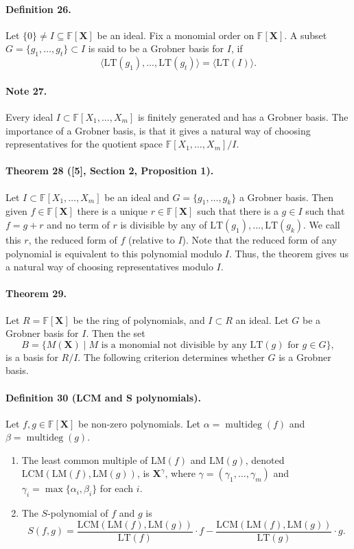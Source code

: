 \documentclass[10pt,a4paper]{article}
\begin{document}
\paragraph{Definition 26.} Let $\{0\}\neq I\subseteq\mathbb F[\boldsymbol X]$ be an ideal. Fix a monomial order on $\mathbb F[\boldsymbol X]$. A subset $G=\{g_1,\ldots,g_t\}\subset I$ is said to be a Grobner basis for $I$, if
\[\langle\mathrm{LT}(g_1),\ldots,\mathrm{LT}(g_t)\rangle=\langle\mathrm{LT}(I)\rangle.\]
\paragraph{Note 27.} Every ideal $I\subset\mathbb F[X_1,\ldots,X_m]$ is finitely generated and has a Grobner basis.
The importance of a Grobner basis, is that it gives a natural way of choosing representatives for the quotient space $\mathbb F[X_1,\ldots,X_m]/I$.
\paragraph{Theorem 28 ([5], Section 2, Proposition 1).} Let $I\subset\mathbb F[X_1,\ldots,X_m]$ be an ideal and $G=\{g_1,\ldots,g_k\}$ a Grobner basis. Then given $f\in\mathbb F[\boldsymbol X]$ there is a unique $r\in\mathbb F[\boldsymbol X]$ such that there is a $g\in I$ such that $f=g+r$ and no term of $r$ is divisible by any of $\mathrm{LT}(g_1),\ldots,\mathrm{LT}(g_k)$. We call this $r$, the reduced form of $f$ (relative to $I$).
Note that the reduced form of any polynomial is equivalent to this polynomial modulo $I$. Thus, the theorem gives us a natural way of choosing representatives modulo $I$.
\paragraph{Theorem 29.} Let $R=\mathbb F[\boldsymbol X]$ be the ring of polynomials, and $I\subset R$ an ideal. Let $G$ be a Grobner basis for $I$. Then the set
\[B=\{M(\boldsymbol X)\mid M\text{ is a monomial not divisible by any }\mathrm{LT}(g)\text{ for }g\in G\},\]
is a basis for $R/I$.
The following criterion determines whether $G$ is a Grobner basis.
\paragraph{Definition 30 (LCM and S polynomials).} Let $f,g\in\mathbb F[\boldsymbol X]$ be non-zero polynomials. Let $\alpha=\operatorname{multideg}(f)$ and $\beta=\operatorname{multideg}(g)$.
\begin{enumerate}
\item The least common multiple of $\mathrm{LM}(f)$ and $\mathrm{LM}(g)$, denoted $\mathrm{LCM}(\mathrm{LM}(f),\mathrm{LM}(g))$, is $\boldsymbol X^\gamma$, where $\gamma=(\gamma_1,\ldots,\gamma_m)$ and $\gamma_i=\max\{\alpha_i,\beta_i\}$ for each $i$.
\item The $S$-polynomial of $f$ and $g$ is
\[S(f,g)=\frac{\mathrm{LCM}(\mathrm{LM}(f),\mathrm{LM}(g))}{\mathrm{LT}(f)}\cdot f-\frac{\mathrm{LCM}(\mathrm{LM}(f),\mathrm{LM}(g))}{\mathrm{LT}(g)}\cdot g.\]
\end{enumerate}
\end{document}
